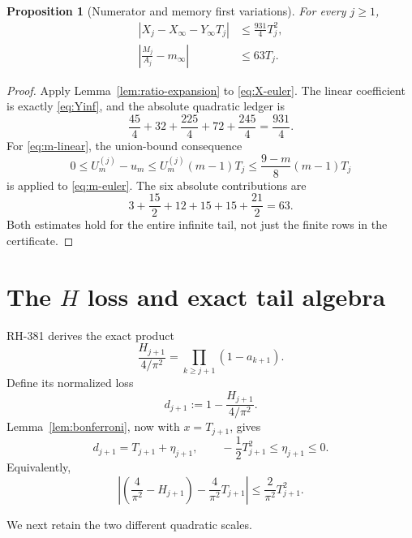 \documentclass[11pt]{article}
\newtheorem{proposition}[theorem]{Proposition}
\theoremstyle{definition}
\theoremstyle{remark}
\begin{document}
\begin{proposition}[Numerator and memory first variations]
\label{prop:first-variations}
For every $j\ge1$,
\begin{align}
 \left|X_j-X_\infty-Y_\infty T_j\right|
 &\le\frac{931}{4}T_j^2,
 \label{eq:X-quadratic}\\
 \left|\frac{M_j}{A_j}-m_\infty\right|
 &\le63T_j.
 \label{eq:m-linear}
\end{align}
\end{proposition}

\begin{proof}
Apply Lemma~\ref{lem:ratio-expansion} to \eqref{eq:X-euler}.  The linear
coefficient is exactly \eqref{eq:Yinf}, and the absolute quadratic ledger is
\[
 \frac{45}{4}+32+\frac{225}{4}+72+\frac{245}{4}
 =\frac{931}{4}.
\]
For \eqref{eq:m-linear}, the union-bound consequence
\[
 0\le U_m^{(j)}-u_m
 \le U_m^{(j)}(m-1)T_j
 \le\frac{9-m}{8}(m-1)T_j
\]
is applied to \eqref{eq:m-euler}.  The six absolute contributions are
\[
 3+\frac{15}{2}+12+15+15+\frac{21}{2}=63.
\]
Both estimates hold for the entire infinite tail, not just the finite rows
in the certificate.
\end{proof}

\section{The \texorpdfstring{$H$}{H} loss and exact tail algebra}

RH-381 derives the exact product \cite{RH381}
\begin{equation}
 \frac{H_{j+1}}{4/\pi^2}
 =\prod_{k\ge j+1}(1-a_{k+1}).
 \label{eq:H-product}
\end{equation}
Define its normalized loss
\begin{equation}
 d_{j+1}:=1-\frac{H_{j+1}}{4/\pi^2}.
 \label{eq:d-loss}
\end{equation}
Lemma~\ref{lem:bonferroni}, now with $x=T_{j+1}$, gives
\begin{equation}
 d_{j+1}=T_{j+1}+\eta_{j+1},\qquad
 -\frac12T_{j+1}^2\le\eta_{j+1}\le0.
 \label{eq:H-quadratic}
\end{equation}
Equivalently,
\[
 \left|\left(\frac4{\pi^2}-H_{j+1}\right)
 -\frac4{\pi^2}T_{j+1}\right|
 \le\frac2{\pi^2}T_{j+1}^2.
\]

We next retain the two different quadratic scales.
\end{document}
